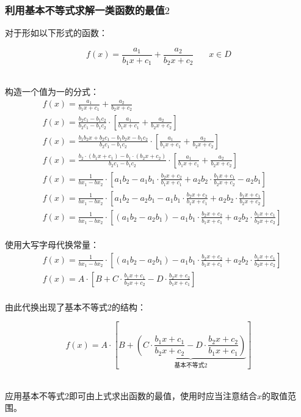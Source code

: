 \documentclass[UTF8]{ctexart}
\begin{document}
\newpage

\subsubsection{利用基本不等式求解一类函数的最值$2$}
    \setcounter{equation}{0}
    对于形如以下形式的函数：
    \begin{large}
        \begin{equation*}
            f(x)=\frac{a_1}{b_1x+c_1}+\frac{a_2}{b_2x+c_2}~~~~~~~~x\in D
        \end{equation*}
    \end{large}\\
    构造一个值为一的分式：\vspace{3pt}
    \begin{align}
        &f(x)=\frac{a_1}{b_1x+c_1}+\frac{a_2}{b_2x+c_2}\\[5mm]
        &f(x)=\frac{b_2c_1-b_1c_2}{b_2c_1-b_1c_2}\cdot\left[\frac{a_1}{b_1x+c_1}+\frac{a_2}{b_2x+c_2}\right]\\[5mm]
        &f(x)=\frac{b_1b_2x+b_2c_1-b_1b_2x-b_1c_2}{b_2c_1-b_1c_2}\cdot\left[\frac{a_1}{b_1x+c_1}+\frac{a_2}{b_2x+c_2}\right]\\[5mm]
        &f(x)=\frac{b_2\cdot(b_1x+c_1)-b_1\cdot(b_2x+c_2)}{b_2c_1-b_1c_2}\cdot\left[\frac{a_1}{b_1x+c_1}+\frac{a_2}{b_2x+c_2}\right]\\[5mm]
        &f(x)=\frac{1}{bx_1-bx_2}\cdot\left[a_1b_2-a_1b_1\cdot\frac{b_2x+c_2}{b_1x+c_1}+a_2b_2\cdot\frac{b_1x+c_1}{b_2x+c_2}-a_2b_1\right]\\[5mm]
        &f(x)=\frac{1}{bx_1-bx_2}\cdot\left[a_1b_2-a_2b_1-a_1b_1\cdot\frac{b_2x+c_2}{b_1x+c_1}+a_2b_2\cdot\frac{b_1x+c_1}{b_2x+c_2}\right]\\[5mm]
        &f(x)=\frac{1}{bx_1-bx_2}\cdot\left[(a_1b_2-a_2b_1)-a_1b_1\cdot\frac{b_2x+c_2}{b_1x+c_1}+a_2b_2\cdot\frac{b_1x+c_1}{b_2x+c_2}\right]
    \end{align}\\[2mm]
    使用大写字母代换常量：\vspace{3pt}
    \begin{align}
        &f(x)=\frac{1}{bx_1-bx_2}\cdot\left[(a_1b_2-a_2b_1)-a_1b_1\cdot\frac{b_2x+c_2}{b_1x+c_1}+a_2b_2\cdot\frac{b_1x+c_1}{b_2x+c_2}\right]\\[5mm]
        &f(x)=A\cdot\left[B+C\cdot\frac{b_1x+c_1}{b_2x+c_2}-D\cdot\frac{b_2x+c_2}{b_1x+c_1}\right]
    \end{align}\\
    由此代换出现了基本不等式$2$的结构：\vspace{3pt}
    \begin{large}
        \begin{equation*}
            f(x)=A\cdot\left[B+\underbrace{\left(C\cdot\frac{b_1x+c_1}{b_2x+c_2}-D\cdot\frac{b_2x+c_2}{b_1x+c_1}\right)}_{\text{基本不等式2}}\right]
        \end{equation*}
    \end{large}\\
    应用基本不等式$2$即可由上式求出函数的最值，使用时应当注意结合$x$的取值范围。
    
\end{document}
